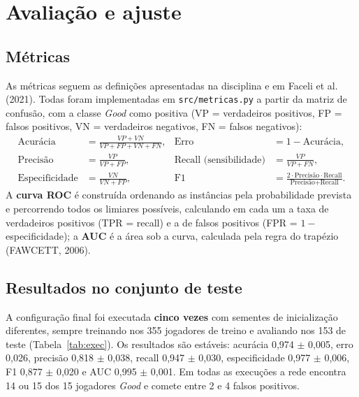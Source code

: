 \documentclass[11pt,a4paper]{article}
\begin{document}
\section{Avaliação e ajuste}\label{sec:avaliacao}

\subsection{Métricas}
As métricas seguem as definições apresentadas na disciplina e em Faceli et al. (2021).
Todas foram implementadas em \texttt{src/metricas.py} a partir da matriz de confusão, com a
classe \emph{Good} como positiva (VP = verdadeiros positivos, FP = falsos positivos, VN = verdadeiros
negativos, FN = falsos negativos):
\[
\begin{aligned}
\text{Acurácia} &= \frac{VP+VN}{VP+FP+VN+FN}, & \text{Erro} &= 1 - \text{Acurácia},\\[4pt]
\text{Precisão} &= \frac{VP}{VP+FP}, & \text{Recall (sensibilidade)} &= \frac{VP}{VP+FN},\\[4pt]
\text{Especificidade} &= \frac{VN}{VN+FP}, & \text{F1} &= \frac{2\cdot\text{Precisão}\cdot\text{Recall}}{\text{Precisão}+\text{Recall}}.
\end{aligned}
\]
A \textbf{curva ROC} é construída ordenando as instâncias pela probabilidade prevista e percorrendo todos os
limiares possíveis, calculando em cada um a taxa de verdadeiros positivos (TPR = recall) e a de falsos
positivos (FPR = $1-$especificidade); a \textbf{AUC} é a área sob a curva, calculada pela regra do trapézio
(FAWCETT, 2006).

\subsection{Resultados no conjunto de teste}\label{sec:execucoes}
A configuração final foi executada \textbf{cinco vezes} com sementes de inicialização diferentes, sempre
treinando nos 355 jogadores de treino e avaliando nos 153 de teste (Tabela~\ref{tab:exec}). Os resultados
são estáveis: acurácia 0,974 $\pm$ 0,005, erro 0,026, precisão 0,818 $\pm$ 0,038, recall 0,947 $\pm$ 0,030,
especificidade 0,977 $\pm$ 0,006, F1 0,877 $\pm$ 0,020 e AUC 0,995 $\pm$ 0,001. Em todas as execuções
a rede encontra 14 ou 15 dos 15 jogadores \emph{Good} e comete entre 2 e 4 falsos positivos.

\begin{table}[H]\centering
\resizebox{\textwidth}{!}{}
\caption{Cinco execuções da configuração final no conjunto de teste (153 jogadores, 15 \emph{Good}).}\label{tab:exec}
\end{table}
\end{document}
